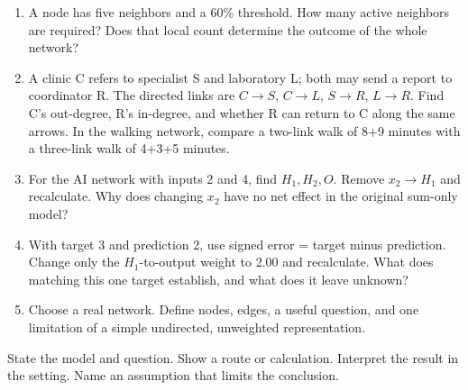 \documentclass[11pt,letterpaper]{article}
\begin{document}
\begin{enumerate}
\item A node has five neighbors and a 60\% threshold. How many active neighbors are required? Does that local count determine the outcome of the whole network?
\item A clinic C refers to specialist S and laboratory L; both may send a report to coordinator R. The directed links are $C\to S$, $C\to L$, $S\to R$, $L\to R$. Find C's out-degree, R's in-degree, and whether R can return to C along the same arrows. In the walking network, compare a two-link walk of 8+9 minutes with a three-link walk of 4+3+5 minutes.
\item For the AI network with inputs 2 and 4, find $H_1,H_2,O$. Remove $x_2\to H_1$ and recalculate. Why does changing $x_2$ have no net effect in the original sum-only model?
\item With target 3 and prediction 2, use signed error = target minus prediction. Change only the $H_1$-to-output weight to 2.00 and recalculate. What does matching this one target establish, and what does it leave unknown?
\item Choose a real network. Define nodes, edges, a useful question, and one limitation of a simple undirected, unweighted representation.
\end{enumerate}
\medskip
\begin{tcolorbox}[title={A reliable explanation has four parts}]
State the model and question. Show a route or calculation. Interpret the result in the setting. Name an assumption that limits the conclusion.
\end{tcolorbox}
\end{document}
